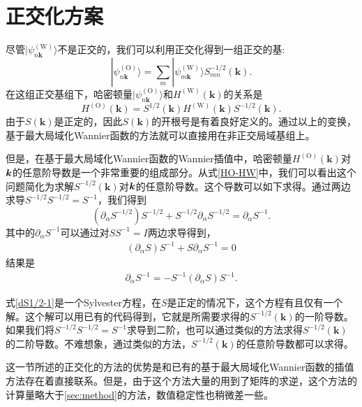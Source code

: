 \section{正交化方案}\label{sec:orthogonalization}

尽管$|\psi^{(\text{W})}_{n\boldsymbol{k}}\rangle$不是正交的，我们可以利用正交化得到一组正交的基:
\begin{equation}
|\psi^{(\text{O})}_{n\boldsymbol{k}}\rangle=
\sum_m |\psi^{(\text{W})}_{m\boldsymbol{k}}\rangle S^{-1/2}_{mn}(\boldsymbol{k}).
\end{equation}
在这组正交基组下，哈密顿量$|\psi^{(\text{O})}_{n\boldsymbol{k}}\rangle$和$H^{(\text{W})}(\boldsymbol{k})$的关系是
\begin{equation}
H^{(\text{O})}(\boldsymbol{k})=S^{1/2}(\boldsymbol{k})H^{(\text{W})}(\boldsymbol{k})S^{-1/2}(\boldsymbol{k}).\label{HO-HW}
\end{equation}
由于$S(\boldsymbol{k})$是正定的，因此$S(\boldsymbol{k})$的开根号是有着良好定义的。通过以上的变换，基于最大局域化Wannier函数的方法就可以直接用在非正交局域基组上。

但是，在基于最大局域化Wannier函数的Wannier插值中，哈密顿量$H^{(\text{O})}(\boldsymbol{k})$对$\boldsymbol{k}$的任意阶导数是一个非常重要的组成部分。从式\ref{HO-HW}中，我们可以看出这个问题简化为求解$S^{-1/2}(\boldsymbol{k})$对$\boldsymbol{k}$的任意阶导数。这个导数可以如下求得。通过两边求导$S^{-1/2}S^{-1/2}=S^{-1}$，我们得到
\begin{equation}
(\partial_{\alpha}S^{-1/2})S^{-1/2}+S^{-1/2}\partial_{\alpha}S^{-1/2}=\partial_{\alpha}S^{-1}.\label{dS1/2-1}
\end{equation}
其中的$\partial_{\alpha}S^{-1}$可以通过对$SS^{-1}=I$两边求导得到，
\begin{align}
(\partial_{\alpha}S)S^{-1}+S\partial_{\alpha}S^{-1}=0
\end{align}
结果是
\begin{align}
\partial_{\alpha}S^{-1} = -S^{-1}(\partial_{\alpha}S)S^{-1}.
\end{align}

式\ref{dS1/2-1}是一个Sylvester方程\cite{sylvester}，在$S$是正定的情况下，这个方程有且仅有一个解。这个解可以用已有的代码得到\cite{laug}，它就是所需要求得的$S^{-1/2}(\boldsymbol{k})$的一阶导数。如果我们将$S^{-1/2}S^{-1/2}=S^{-1}$求导到二阶，也可以通过类似的方法求得$S^{-1/2}(\boldsymbol{k})$的二阶导数。不难想象，通过类似的方法，$S^{-1/2}(\boldsymbol{k})$的任意阶导数都可以求得。


这一节所述的正交化的方法的优势是和已有的基于最大局域化Wannier函数的插值方法存在着直接联系。但是，由于这个方法大量的用到了矩阵的求逆，这个方法的计算量略大于\ref{sec:method}的方法，数值稳定性也稍微差一些。


